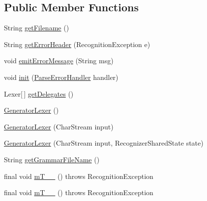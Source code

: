 \subsection*{Public Member Functions}
\begin{DoxyCompactItemize}
\item 
String \hyperlink{classorg_1_1tzi_1_1use_1_1parser_1_1generator_1_1_generator_lexer_a3f5bcddb571ddcca168b856a18ac2564}{get\-Filename} ()
\item 
String \hyperlink{classorg_1_1tzi_1_1use_1_1parser_1_1generator_1_1_generator_lexer_a0f6a5586018d7c1a802796059d35bd82}{get\-Error\-Header} (Recognition\-Exception e)
\item 
void \hyperlink{classorg_1_1tzi_1_1use_1_1parser_1_1generator_1_1_generator_lexer_a296be39002a5ce931fb6d2e5f595b015}{emit\-Error\-Message} (String msg)
\item 
void \hyperlink{classorg_1_1tzi_1_1use_1_1parser_1_1generator_1_1_generator_lexer_a02cef4f1f14da2c5099f8b48a71dafcd}{init} (\hyperlink{classorg_1_1tzi_1_1use_1_1parser_1_1_parse_error_handler}{Parse\-Error\-Handler} handler)
\item 
Lexer\mbox{[}$\,$\mbox{]} \hyperlink{classorg_1_1tzi_1_1use_1_1parser_1_1generator_1_1_generator_lexer_ad5477e6d814e242d03fc460596386591}{get\-Delegates} ()
\item 
\hyperlink{classorg_1_1tzi_1_1use_1_1parser_1_1generator_1_1_generator_lexer_ae89ccab072ffa0f197010d2329fa62c4}{Generator\-Lexer} ()
\item 
\hyperlink{classorg_1_1tzi_1_1use_1_1parser_1_1generator_1_1_generator_lexer_a54eca145c76ebd0d67e62828ead69b18}{Generator\-Lexer} (Char\-Stream input)
\item 
\hyperlink{classorg_1_1tzi_1_1use_1_1parser_1_1generator_1_1_generator_lexer_a8123ef1dbf3b6c592ee99e093d8ef2b9}{Generator\-Lexer} (Char\-Stream input, Recognizer\-Shared\-State state)
\item 
String \hyperlink{classorg_1_1tzi_1_1use_1_1parser_1_1generator_1_1_generator_lexer_adae721ee852c0b58ef217da2359e22bf}{get\-Grammar\-File\-Name} ()
\item 
final void \hyperlink{classorg_1_1tzi_1_1use_1_1parser_1_1generator_1_1_generator_lexer_a77af9f0509a881e35fd7d550fcb5a8df}{m\-T\-\_\-\-\_} ()  throws Recognition\-Exception 
\item 
final void \hyperlink{classorg_1_1tzi_1_1use_1_1parser_1_1generator_1_1_generator_lexer_ae5ec3221242ce9135a1a916a17b69061}{m\-T\-\_\-\-\_} ()  throws Recognition\-Exception 
\item 

\end{DoxyCompactItemize}
